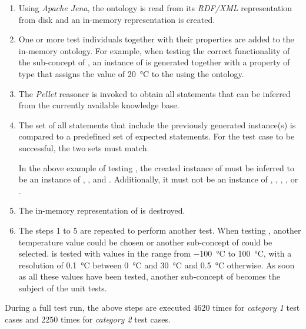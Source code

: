 \begin{enumerate}
  \item Using \emph{Apache Jena}, the \smarthomeweather ontology is read from its \emph{RDF/XML} representation from disk and an in-memory representation is created.
  \item One or more test individuals together with their properties are added to the in-memory ontology. For example, when testing the correct functionality of the sub-concept  of , an instance of  is generated together with a property of type  that assigns the value of \SI{20}{\celsius} to the  using the \muo ontology.
  \item The \emph{Pellet} reasoner is invoked to obtain all statements that can be inferred from the currently available knowledge base.
  \item The set of all statements that include the previously generated instance(s) is compared to a predefined set of expected statements. For the test case to be successful, the two sets must match.
  
  In the above example of testing , the created instance of  must be inferred to be an instance of , , and . Additionally, it must not be an instance of , , , , or .
  \item The in-memory representation of \smarthomeweather is destroyed.
  \item The steps 1 to 5 are repeated to perform another test. When testing , another temperature value could be chosen  or another sub-concept of  could be selected.  is tested with values in the range from \SI{-100}{\celsius} to \SI{100}{\celsius}, with a resolution of \SI{0.1}{\celsius} between \SI{0}{\celsius} and \SI{30}{\celsius} and \SI{0.5}{\celsius} otherwise. As soon as all these values have been tested, another sub-concept of  becomes the subject of the unit tests.
\end{enumerate}

During a full test run, the above steps are executed \num{4620} times for \emph{category 1} test cases and \num{2250} times for \emph{category 2} test cases.

